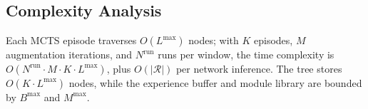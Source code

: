 \subsection{Complexity Analysis}
\label{subsec:complexity}

Each MCTS episode traverses $O(L^{\max})$ nodes; with $K$ episodes, $M$ augmentation iterations, and $N^{\text{run}}$ runs per window, the time complexity is $O(N^{\text{run}} \cdot M \cdot K \cdot L^{\max})$, plus $O(|\mathcal{R}|)$ per network inference. The tree stores $O(K \cdot L^{\max})$ nodes, while the experience buffer and module library are bounded by $B^{\max}$ and $M^{\max}$.
